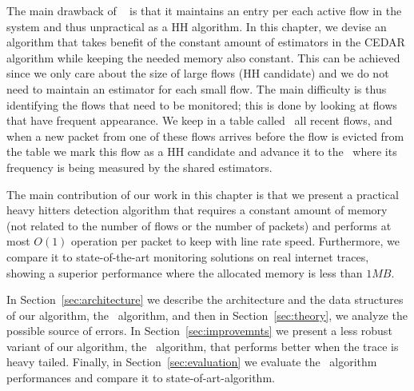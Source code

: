 The main drawback of ~\cite{CEDAR} is that it maintains an entry per each active flow in the system and thus unpractical as a HH algorithm.
In this chapter, we devise an algorithm that takes benefit of the constant amount of estimators in the CEDAR algorithm while keeping the needed memory also constant. This can be achieved since we only care about the size of large flows (HH candidate) and we do not need to maintain an estimator for each small flow. The main difficulty is thus identifying the flows that need to be monitored; this is done by looking at flows that have frequent appearance.  We keep in a table called   \sfa\ all recent flows, and when a new packet from one of these flows arrives before the flow is evicted from the table we mark this flow as a HH candidate and advance it to the \cs\ where its frequency is being measured by the shared estimators. 

The main contribution of our work in this chapter is that we present a practical heavy hitters detection algorithm that requires a constant amount of memory (not related to the number of flows or the number of packets) and performs at most $O(1)$ operation per packet to keep with line rate speed. Furthermore, we compare it to state-of-the-art monitoring solutions on real internet traces, showing a superior performance where the allocated memory is less than $1MB$.


In Section~\ref{sec:architecture} we describe the architecture and the data structures of our algorithm, the \cs\ algorithm, and then in Section~\ref{sec:theory}, we analyze  the possible source of errors. In Section~\ref{sec:improvemnts} we present a less robust variant of our algorithm, the \eb\ algorithm, that performs better when the trace is heavy tailed. Finally, in Section~\ref{sec:evaluation} we evaluate the \cs\ algorithm performances and compare it to state-of-art-algorithm.
